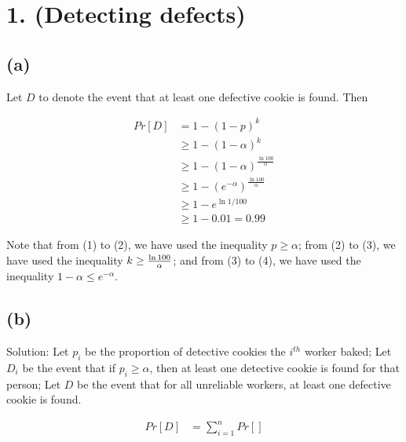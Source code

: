 \documentclass[10pt]{537homework}
\author{Peilun Dai}
\begin{document}
\section*{1. (Detecting defects) }


\subsection*{(a)} \proof 

Let $D$ to denote the event that at least one defective cookie is found. Then 

\begin{align}
	Pr[D] 	& = 1 - (1-p)^k \\
			& \geq 1 - (1-\alpha)^k \\
			& \geq 1 - (1-\alpha)^{\frac{\ln{100}}{\alpha}} \\
			& \geq 1 - (e^{-\alpha})^{\frac{\ln{100}}{\alpha}} \\
			& \geq 1 - e^{\ln{1/100}} \\
			& \geq 1 - 0.01 = 0.99
\end{align}

Note that from (1) to (2), we have used the inequality $p \geq \alpha$; from (2) to (3), we have used the inequality $k \geq {\ln{100} \over \alpha}$; and from (3) to (4), we have used the inequality $1-\alpha \leq e^{-\alpha}$. 
  

\subsection*{(b)} Solution: Let $p_i$ be the proportion of detective cookies the $i^{th}$ worker baked; Let $D_i$ be the event that if $p_i \geq \alpha$, then at least one detective cookie is found for that person; Let $D$ be the event that for all unreliable workers, at least one defective cookie is found. 

\begin{align}
  Pr[D]     & = \sum_{i=1}^n Pr[]
\end{align}
\end{document}
